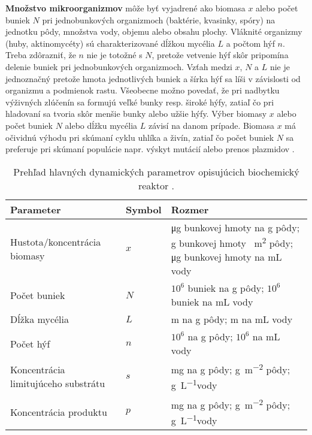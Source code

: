 \textbf{Množstvo mikroorganizmov} môže byť vyjadrené ako biomasa $x$ alebo počet buniek $N$ pri jednobunkových organizmoch (baktérie, kvasinky, spóry) na jednotku pôdy, množstva vody, objemu alebo obsahu plochy. Vláknité organizmy (huby, aktinomycéty) sú charakterizované dĺžkou mycélia $L$ a počtom hýf $n$. Treba zdôrazniť, že $n$ nie je totožné s $N$, pretože vetvenie hýf skôr pripomína delenie buniek pri jednobunkových organizmoch. Vzťah medzi $x$, $N$ a $L$ nie je jednoznačný pretože hmota jednotlivých buniek a šírka hýf sa líši v závislosti od organizmu a podmienok rastu. Všeobecne možno povedať, že pri nadbytku výživných zlúčenín sa formujú veľké bunky resp. široké hýfy, zatiaľ čo pri hladovaní sa tvoria skôr menšie bunky alebo užšie hýfy. Výber biomasy $x$ alebo počet buniek $N$ alebo dĺžku mycélia $L$ závisí na danom prípade. Biomasa $x$ má očividnú výhodu pri skúmaní cyklu uhlíka a živín, zatiaľ čo počet buniek $N$ sa preferuje pri skúmaní populácie napr. výskyt mutácií alebo prenos plazmidov \cite{panikov:kinetics_MO_processes:2016}.

\begin{table}
	\centering
	\caption{Prehľad hlavných dynamických parametrov opisujúcich biochemický reaktor \cite{panikov:kinetics_MO_processes:2016}.}
	\label{tab:chemostat_dyn_param}
	\begin{tabular}{p{5cm} p{1.9cm} p{4cm}}
		\hline
		\textbf{Parameter} & \textbf{Symbol} & \textbf{Rozmer} \\ 
		\hline
		Hustota/koncentrácia biomasy & $x$ & \si{\micro\gram} bunkovej hmoty na \si{\gram} pôdy; \si{\gram} bunkovej hmoty \si{\per\square\meter} pôdy; \si{\micro\gram} bunkovej hmoty na \si{\milli\liter} vody\\
		Počet buniek & $N$ & $10^{6}$ buniek na \si{\gram} pôdy; $10^{6}$ buniek na \si{\milli\liter} vody\\
		Dĺžka mycélia & $ L $ & \si{\meter} na \si{\gram} pôdy; \si{\meter} na \si{\milli\liter} vody\\
		Počet hýf & $n$ & $10^{6}$ na \si{\gram} pôdy; $10^{6}$ na \si{\milli\liter} vody\\
		Koncentrácia limitujúceho substrátu & $s$ & \si{\milli\gram} na \si{\gram} pôdy; \si{\gram\per\square\meter} pôdy; \si{\gram\per\liter}vody\\
		Koncentrácia produktu & $p$ & \si{\milli\gram} na \si{\gram} pôdy; \si{\gram\per\square\meter} pôdy; \si{\gram\per\liter}vody\\
		\hline	
	\end{tabular}
\end{table}

